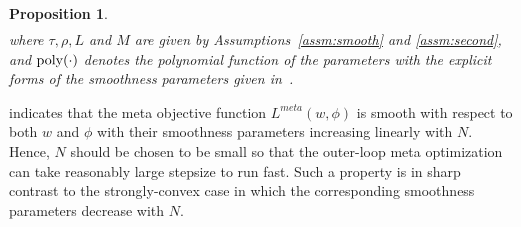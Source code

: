 \documentclass{osudissert96}
\newtheorem{proposition}{Proposition}
\begin{document}
\begin{proposition}
\begin{align*}
\end{align*}
where $\tau,\rho,L$ and $M$ are given by Assumptions~\ref{assm:smooth} and \ref{assm:second}, and $\text{\normalfont poly}(\cdot)$ denotes the polynomial function of the parameters with the explicit forms of the smoothness parameters given in~.

\end{proposition}
 indicates that the meta objective function $L^{meta}(w,\phi)$ is smooth with respect to both $w$ and $\phi$ with their smoothness parameters increasing linearly with $N$. Hence, $N$ should be chosen to be small so that the outer-loop meta optimization can take reasonably large stepsize to run fast. Such a property is in sharp contrast to the strongly-convex case in which the corresponding smoothness parameters decrease with $N$.
 
\end{document}
